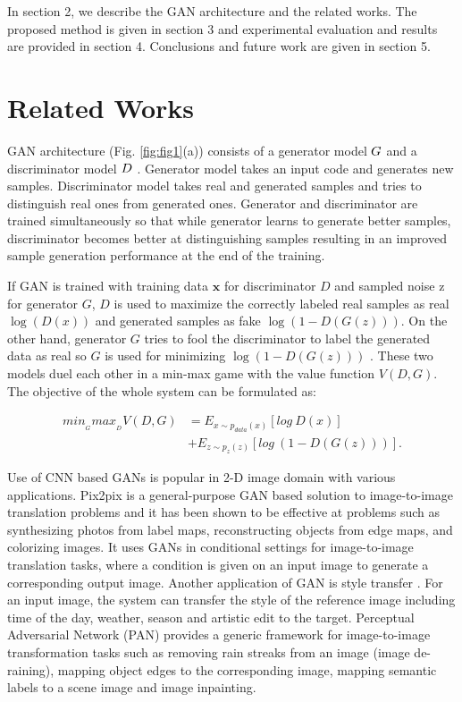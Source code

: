 \documentclass[runningheads]{llncs}
\begin{document}
In section 2, we describe the GAN architecture and the related works. The proposed method is given in section 3 and experimental evaluation and results are provided in section 4. Conclusions and future work are given in section 5.

\section{Related Works}
\label{sect:relatedworks} GAN architecture (Fig. \ref{fig:fig1}(a)) consists of a generator model $\mathnormal{G}$ and a discriminator model $\mathnormal{D}$ \cite{goodfellow2014generative}. Generator model takes an input code and generates new samples. Discriminator model takes real and generated samples and tries to distinguish real ones from generated ones. Generator and discriminator are trained simultaneously so that while generator learns to generate better samples, discriminator becomes better at distinguishing samples resulting in an improved sample generation performance at the end of the training.

	If GAN is trained with training data $\mathbf{x}$ for discriminator $D$ and sampled noise z for generator $G$, $D$ is used to maximize the correctly labeled real samples as real $\log(D(x))$ and generated samples as fake $\log(1 - D(G(z)))$. On the other hand, generator $G$ tries to fool the discriminator to label the generated data as real so $G$ is used for minimizing $\log(1 - D(G(z)))$ . These two models duel each other in a min-max game with the value function $V(D,G)$. The objective of the whole system can be formulated as: 

\begin{equation}
\begin{split}
min_{_{G}}max_{_{D}}V(D,G) &= E_{x\sim p_{data}(x)}[log~D(x)]\\
&+  E_{z\sim p_{z}(z)}[log~ (1-D(G(z)))].
\end{split}
\end{equation}

Use of CNN based GANs \cite{radford2015unsupervised} is popular in 2-D image domain with various applications.  Pix2pix \cite{isola2017image} is a general-purpose GAN based solution to image-to-image translation problems and it has been shown to be effective at problems such as synthesizing photos from label maps, reconstructing objects from edge maps, and colorizing images. It uses GANs in conditional settings for image-to-image translation tasks, where a condition is given on an input image to generate a corresponding output image. Another application of GAN is style transfer \cite{luan2017deep}. For an input image, the system can transfer the style of the reference image including time of the day, weather, season and artistic edit to the target. Perceptual Adversarial Network (PAN) \cite{wang2018perceptual} provides a generic framework for image-to-image transformation tasks such as removing rain streaks from an image (image de-raining), mapping object edges to the corresponding image, mapping semantic labels to a scene image and image inpainting.
\end{document}
